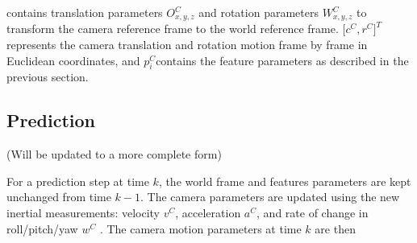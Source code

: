 contains translation parameters $O_{x,y,z}^{C}$ and 
rotation parameters $W_{x,y,z}^{C}$ to transform the camera reference 
frame to the world reference frame. $\lbrack c^{C},r^{C}\rbrack ^{T}$
represents the camera translation and rotation motion frame by frame in 
Euclidean coordinates, and $p_{i}^{C}$contains the feature parameters 
as described in the previous section. 

\subsection{Prediction} (Will be updated to a more complete form)

For a prediction step at time $k$, the world frame and features 
parameters are kept unchanged from time $k-1$. The camera parameters 
are updated using the new inertial measurements: velocity $v^{C}$, 
acceleration $a^{C}$, and rate of change in roll/pitch/yaw $w^{C}$
. The camera motion parameters at time $k$ are then

